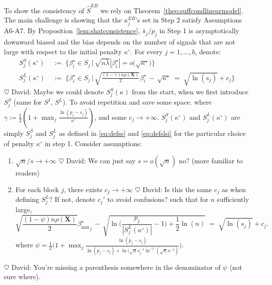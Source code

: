 \documentclass[aos]{imsart}
\theoremstyle{plain}
\newcommand{\david}[1]{{\small{\color{blue} \sf $\heartsuit$ David: #1}}}
\newcommand{\bs}{\boldsymbol}
\begin{document}
To show the consistency of $\hat{S}^{EB}$ we rely on Theorem~\ref{theo:suffcondlinearmodel}. The main challenge is showing that the $\kappa_j^{EB}$'s set in Step 2 satisfy Assumptions A6-A7. By Proposition~\ref{lem:shatconsistence}, $\widehat{s}_j/p_j$ in Step 1 is asymptotically downward biased and the bias depends on the number of signals that are not large with respect to the initial penalty $\kappa^{\circ}$. For every $j=1,\ldots,b$, denote:
\begin{align*}
    S_j^{S}(\kappa^{\circ})\;&:=\;\Bigg\{\beta_i^{\star} \in S_j \,\Big|\,\sqrt{n\bar{\lambda}}|\beta_{i}^{\star}|=o\big(\sqrt{\kappa^{\circ}}\big) \Bigg\} \\
    S_j^{L}(\kappa^{\circ})\;&:=\;\Bigg\{\beta_i^{\star} \in S_j \,\Big|\,\sqrt{\frac{(1-\gamma)n\rho(\bs X)}{2}}{\beta_{i}^{\star}} \,- \,\sqrt{\kappa^{\circ}} \;=\; \sqrt{\ln(s_j)} + c_{j}\Bigg\}
\end{align*}
\david{Maybe we could denote $S_j^S(\kappa)$ from the start, when we first introduce $S_j^S$ (same for $S^I$, $S^L$). To avoid repetition and save some space.}
where $\gamma:=\frac12(1+\max_j \frac{\ln(p_j-s_j)}{\kappa^{\circ}})$, and
some $c_j\to+\infty$. $S_j^{S}(\kappa^{\circ})$ and $S_j^{L}(\kappa^{\circ})$ are simply $S_j^{S}$ and $S_j^{L}$ as defined in \eqref{eq:defss} and \eqref{eq:defslsi} for the particular choice of penalty $\kappa^{\circ}$ in step 1. Consider assumptions:
\begin{enumerate}[start=8,label={(A\arabic*)}]
    \item $\sqrt{n}/s \to +\infty$  \david{We can just say $s=o(\sqrt{n})$ no? (more familiar to readers)}\\
\item For each block $j$, there exists $c_{j}\to +\infty$ \david{Is this the same $c_j$ as when defining $S_j^L$? If not, denote $c_j'$ to avoid confusions?} such that for $n$ sufficiently large, %
    \begin{equation*}\label{cond:suffIIreg2}
        \sqrt{\frac{ (1-\psi)n\rho(\bs X)}{2}}{{\beta_{\min}^{\star}}_j} \,- \,\sqrt{\ln\big(\frac{p_j}{|S^L_j(\kappa^{\circ})|}-1\big)+\frac12\ln(n)} \;=\; \sqrt{\ln(s_j)} + c_{j} .
    \end{equation*}
where $\psi=\frac12\big(1+\max_j \frac{\ln(p_j-s_j)}{\ln(p_j-s_j)+\ln(\sqrt{n}s_j^{-1}\ln^{-1}(\sqrt{n}s^{-1})}\big)$.
\end{enumerate}
\david{You're missing a parenthesis somewhere in the denominator of $\psi$ (not sure where).}
\end{document}
